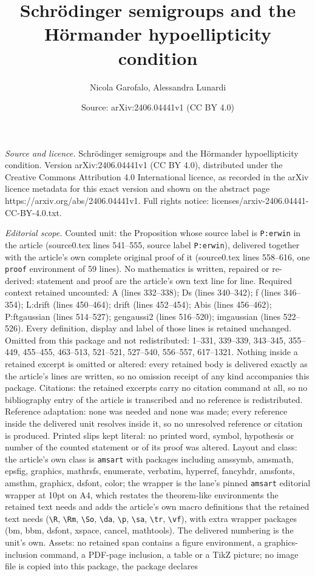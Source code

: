 \documentclass[10pt,a4paper]{amsart}
\title[Schr\"odinger semigroups and the H\"ormander hypoellipticity]{Schr\"odinger semigroups and the H\"ormander hypoellipticity condition}
\author{Nicola Garofalo, Alessandra Lunardi}
\date{Source: arXiv:2406.04441v1 (CC BY 4.0)}
\begin{document}
\maketitle

\noindent\emph{Source and licence.} Schr\"odinger semigroups and the H\"ormander hypoellipticity condition. Version arXiv:2406.04441v1 (CC BY 4.0), distributed under the Creative Commons Attribution 4.0 International licence, as recorded in the arXiv licence metadata for this exact version and shown on the abstract page https://arxiv.org/abs/2406.04441v1. Full rights notice: licenses/arxiv-2406.04441-CC-BY-4.0.txt.\par\smallskip

\noindent\textit{Editorial scope.} Counted unit: the Proposition whose source label is \texttt{P:erwin} in the article (source0.tex lines 541--555, source label \texttt{P:erwin}), delivered together with the article's own complete original proof of it (source0.tex lines 558--616, one \texttt{proof} environment of 59 lines). No mathematics is written, repaired or re-derived: statement and proof are the article's own text line for line. Required context retained uncounted: A (lines 332--338); Ds (lines 340--342); f (lines 346--354); L:drift (lines 450--464); drift (lines 452--454); Abis (lines 456--462); P:ftgaussian (lines 514--527); gengaussi2 (lines 516--520); imgaussian (lines 522--526). Every definition, display and label of those lines is retained unchanged. Omitted from this package and not redistributed: 1--331, 339--339, 343--345, 355--449, 455--455, 463--513, 521--521, 527--540, 556--557, 617--1321. Nothing inside a retained excerpt is omitted or altered: every retained body is delivered exactly as the article's lines are written, so no omission receipt of any kind accompanies this package. Citations: the retained excerpts carry no citation command at all, so no bibliography entry of the article is transcribed and no reference is redistributed. Reference adaptation: none was needed and none was made; every reference inside the delivered unit resolves inside it, so no unresolved reference or citation is produced. Printed slips kept literal: no printed word, symbol, hypothesis or number of the counted statement or of its proof was altered. Layout and class: the article's own class is \texttt{amsart} with packages including amssymb, amsmath, epsfig, graphics, mathrsfs, enumerate, verbatim, hyperref, fancyhdr, amsfonts, amsthm, graphicx, dsfont, color; the wrapper is the lane's pinned \texttt{amsart} editorial wrapper at 10pt on A4, which restates the theorem-like environments the retained text needs and adds the article's own macro definitions that the retained text needs (\texttt{\textbackslash R}, \texttt{\textbackslash Rm}, \texttt{\textbackslash So}, \texttt{\textbackslash da}, \texttt{\textbackslash p}, \texttt{\textbackslash sa}, \texttt{\textbackslash tr}, \texttt{\textbackslash vf}), with extra wrapper packages (bm, bbm, dsfont, xspace, cancel, mathtools). The delivered numbering is the unit's own. Assets: no retained span contains a figure environment, a graphics-inclusion command, a PDF-page inclusion, a table or a TikZ picture; no image file is copied into this package, the package declares 
\end{document}
